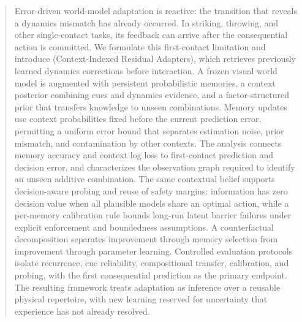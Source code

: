 \begin{abstract}
Error-driven world-model adaptation is reactive: the transition that reveals a dynamics mismatch has already occurred. In striking, throwing, and other single-contact tasks, its feedback can arrive after the consequential action is committed. We formulate this first-contact limitation and introduce \method{} (Context-Indexed Residual Adapters), which retrieves previously learned dynamics corrections before interaction. A frozen visual world model is augmented with persistent probabilistic memories, a context posterior combining cues and dynamics evidence, and a factor-structured prior that transfers knowledge to unseen combinations. Memory updates use context probabilities fixed before the current prediction error, permitting a uniform error bound that separates estimation noise, prior mismatch, and contamination by other contexts. The analysis connects memory accuracy and context log loss to first-contact prediction and decision error, and characterizes the observation graph required to identify an unseen additive combination. The same contextual belief supports decision-aware probing and reuse of safety margins: information has zero decision value when all plausible models share an optimal action, while a per-memory calibration rule bounds long-run latent barrier failures under explicit enforcement and boundedness assumptions. A counterfactual decomposition separates improvement through memory selection from improvement through parameter learning. Controlled evaluation protocols isolate recurrence, cue reliability, compositional transfer, calibration, and probing, with the first consequential prediction as the primary endpoint. The resulting framework treats adaptation as inference over a reusable physical repertoire, with new learning reserved for uncertainty that experience has not already resolved.
\end{abstract}
